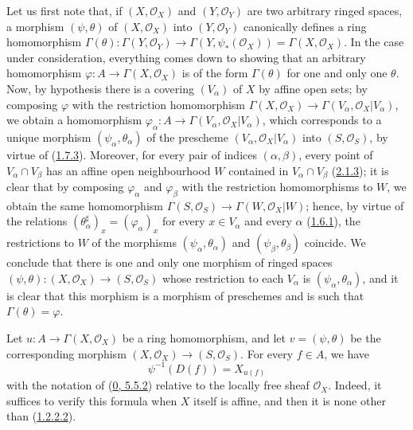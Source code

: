Let us first note that, if $(X,\mathscr{O}_X)$ and $(Y,\mathscr{O}_Y)$ are
two arbitrary ringed spaces, a morphism $(\psi,\theta)$ of
$(X,\mathscr{O}_X)$ into $(Y,\mathscr{O}_Y)$ canonically defines a ring
homomorphism
$\Gamma(\theta):\Gamma(Y,\mathscr{O}_Y)\to
\Gamma(Y,\psi_*(\mathscr{O}_X))=\Gamma(X,\mathscr{O}_X)$. In the case under
consideration, everything comes down to showing that an arbitrary
homomorphism $\varphi:A\to\Gamma(X,\mathscr{O}_X)$ is of the form
$\Gamma(\theta)$ for one and only one $\theta$. Now, by hypothesis there is
a covering $(V_\alpha)$ of $X$ by affine open sets; by composing $\varphi$
with the restriction homomorphism
$\Gamma(X,\mathscr{O}_X)\to
\Gamma(V_\alpha,\mathscr{O}_X|V_\alpha)$, we obtain a homomorphism
$\varphi_\alpha:A\to\Gamma(V_\alpha,\mathscr{O}_X|V_\alpha)$, which
corresponds to a unique morphism $(\psi_\alpha,\theta_\alpha)$ of the
prescheme $(V_\alpha,\mathscr{O}_X|V_\alpha)$ into $(S,\mathscr{O}_S)$, by
virtue of (\hyperref[I.1.7.3]{1.7.3}). Moreover, for every pair of
indices $(\alpha,\beta)$, every point of $V_\alpha\cap V_\beta$ has an
affine open neighbourhood $W$ contained in $V_\alpha\cap V_\beta$
(\hyperref[I.2.1.3]{2.1.3}); it is clear that by composing
$\varphi_\alpha$ and $\varphi_\beta$ with the restriction homomorphisms to
$W$, we obtain the same homomorphism
$\Gamma(S,\mathscr{O}_S)\to\Gamma(W,\mathscr{O}_X|W)$; hence, by virtue of
the relations $(\theta_\alpha^\sharp)_x=(\varphi_\alpha)_x$ for every
$x\in V_\alpha$ and every $\alpha$ (\hyperref[I.1.6.1]{1.6.1}), the
restrictions to $W$ of the morphisms $(\psi_\alpha,\theta_\alpha)$ and
$(\psi_\beta,\theta_\beta)$ coincide. We conclude that there is one and only
one morphism of ringed spaces
$(\psi,\theta):(X,\mathscr{O}_X)\to(S,\mathscr{O}_S)$ whose
restriction to each $V_\alpha$ is $(\psi_\alpha,\theta_\alpha)$, and it is
clear that this morphism is a morphism of preschemes and is such that
$\Gamma(\theta)=\varphi$.

Let $u:A\to\Gamma(X,\mathscr{O}_X)$ be a ring homomorphism, and let
$v=(\psi,\theta)$ be the corresponding morphism
$(X,\mathscr{O}_X)\to(S,\mathscr{O}_S)$. For every $f\in A$, we have
\begin{equation}
  \psi^{-1}(D(f))=X_{u(f)}
  \tag{2.2.4.1}\label{I.2.2.4.1}
\end{equation}
with the notation of (\hyperref[0.5.5.2]{0, 5.5.2}) relative to the
locally free sheaf $\mathscr{O}_X$. Indeed, it suffices to verify this
formula when $X$ itself is affine, and then it is none other than
(\hyperref[I.1.2.2.2]{1.2.2.2}).

